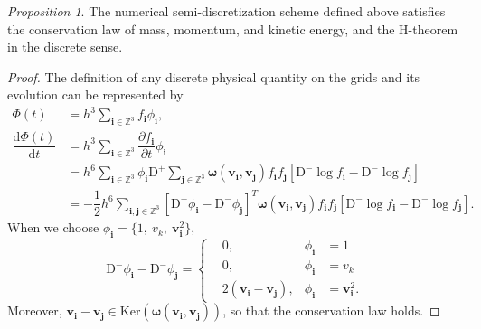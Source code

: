 \documentclass[preprint,1p,times]{elsarticle}
\theoremstyle{definition}
\theoremstyle{remark}
\newtheorem{proposition}{Proposition}
\begin{document}
\begin{proposition}
    The numerical semi-discretization scheme defined above satisfies the conservation law of mass, momentum, and kinetic energy, and the H-theorem in the discrete sense.
\end{proposition}

\begin{proof}
The definition of any discrete physical quantity on the grids and its evolution can be represented by
\begin{equation}
    \begin{aligned}
        \Phi(t) &= h^{3} \sum_{\boldsymbol{i}\in\mathbb{Z}^{3}} f_{\boldsymbol{i}} \phi_{\boldsymbol{i}} , \\
        \dfrac{\mathrm{d} \Phi(t)}{\mathrm{d} t} &=  h^{3} \sum_{\boldsymbol{i}\in\mathbb{Z}^{3}} \dfrac{\partial f_{\boldsymbol{i}}}{\partial t} \phi_{\boldsymbol{i}} \\
        &= h^{6} \sum_{\boldsymbol{i}\in\mathbb{Z}^{3}} \phi_{\boldsymbol{i}} \mathrm{D}^{+} \sum_{\boldsymbol{j}\in\mathbb{Z}^{3}} \boldsymbol{\omega}(\boldsymbol{v}_{\boldsymbol{i}}, \boldsymbol{v}_{\boldsymbol{j}}) f_{\boldsymbol{i}} f_{\boldsymbol{j}} \left[ \mathrm{D}^{-} \log f_{\boldsymbol{i}} - \mathrm{D}^{-} \log f_{\boldsymbol{j}} \right] \\
        &= -\dfrac{1}{2} h^{6} \sum_{\boldsymbol{i},\boldsymbol{j}\in\mathbb{Z}^{3}} \left[ \mathrm{D}^{-} \phi_{\boldsymbol{i}} - \mathrm{D}^{-} \phi_{\boldsymbol{j}} \right]^{T} \boldsymbol{\omega}(\boldsymbol{v}_{\boldsymbol{i}}, \boldsymbol{v}_{\boldsymbol{j}}) f_{\boldsymbol{i}} f_{\boldsymbol{j}} \left[ \mathrm{D}^{-} \log f_{\boldsymbol{i}} - \mathrm{D}^{-} \log f_{\boldsymbol{j}} \right] .
    \end{aligned}
\end{equation}
%
When we choose $\phi_{\boldsymbol{i}} = \{1, ~ v_{k},~ \boldsymbol{v}_{\boldsymbol{i}}^{2} \}$,
\begin{equation}
	\mathrm{D}^{-} \phi_{\boldsymbol{i}} - \mathrm{D}^{-} \phi_{\boldsymbol{j}} = \left\{
	\begin{aligned}
		&0 , & \phi_{\boldsymbol{i}} &= 1 \\
		&0 , & \phi_{\boldsymbol{i}} &= v_{k} \\
		&2(\boldsymbol{v}_{\boldsymbol{i}} - \boldsymbol{v}_{\boldsymbol{j}}) , & \phi_{\boldsymbol{i}} &= \boldsymbol{v}_{\boldsymbol{i}}^{2} .
	\end{aligned}
	\right.
\end{equation}
%
Moreover, $\boldsymbol{v}_{\boldsymbol{i}} - \boldsymbol{v}_{\boldsymbol{j}} \in \text{Ker}(\boldsymbol{\omega}(\boldsymbol{v}_{\boldsymbol{i}}, \boldsymbol{v}_{\boldsymbol{j}}))$, so that the conservation law holds.


\end{proof}
\end{document}
